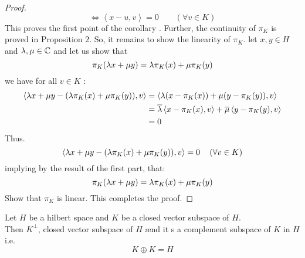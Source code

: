 \begin{corollary}[]
\begin{proof}
\[\]
\[
\iff \left\langle x-u, v \right\rangle  
= 0 \quad \quad 
\left( 
  \forall v \in  K
\right)
\]
This proves the first point of
the corollary . 
Further, the continuity of $\pi _{K} $ 
is proved in Proposition $2 $. So, it remains
to show the linearity of $\pi _{K} $. 
let $x,y \in  H $ and $\lambda,\mu \in  \mathbb{C}  $ and 
let us show that 
\[
\pi _{K}(\lambda x + \mu  y)  
= 
\lambda \pi _{K}(x)  + 
\mu \pi _{K}(y) 
\]
we have for all $v \in K $ :
\begin{align*}
\left\langle 
  \lambda x + \mu  y- 
  (\lambda \pi _{K}(x) + \mu \pi _{K}(y) ) , v
\right\rangle &=
\left\langle 
  \lambda(x - \pi _{K}(x) )  + 
  \mu (y - \pi _{K}(y) )  , v
\right\rangle  \\
              &= 
             \overline{\lambda} 
           \left\langle 
             x - \pi _{K}(x), v 
           \right\rangle  + 
           \overline{\mu }
           \left\langle 
             y - \pi _{K}(y) , v
           \right\rangle       \\
              &= 0
\end{align*}
Thus. 
\[
\left\langle 
  \lambda x + \mu  y - 
  (\lambda \pi _{K}(x) + \mu \pi _{K}(y)  ), v
\right\rangle  = 0 
\quad \left( 
  \forall  v \in  K
\right)
\]
implying by the result of the first part, that: 
\[
\pi _{K}(\lambda x + \mu y)  =
\lambda \pi _{K}(x)  + \mu \pi _{K}(y) 
\]
Show that $\pi _{K} $ is linear. This completes
the proof.
\end{proof}
\end{corollary}
\begin{corollary}[]
Let $H $ be a hilbert space and $K $ 
be a closed vector subspace
of $H $. \\
Then $K^{\bot } $, closed vector subspace 
of $H $ ænd it s a complement subspace
of $K$ in $H $ i.e. 
\[
K \oplus K = H
\]

\end{corollary}
% 
